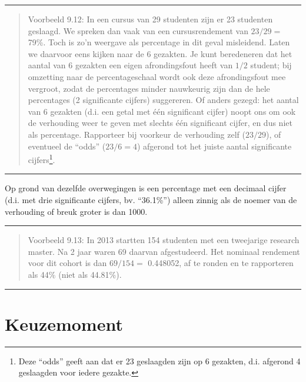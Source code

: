 \documentclass[
]{book}
\begin{document}
\begin{center}\rule{0.5\linewidth}{0.5pt}\end{center}

\begin{quote}
Voorbeeld 9.12:
In een cursus van 29 studenten zijn er 23 studenten geslaagd. We spreken
dan vaak van een cursusrendement van \(23/29=\) 79\%. Toch is zo'n weergave
als percentage in dit geval misleidend. Laten we daarvoor eens kijken
naar de 6 gezakten. Je kunt beredeneren dat het aantal van 6 gezakten
een eigen afrondingsfout heeft van \(1/2\) student; bij omzetting naar de
percentageschaal wordt ook deze afrondingsfout mee vergroot, zodat de
percentages minder nauwkeurig zijn dan de hele percentages (2
significante cijfers) suggereren. Of anders gezegd: het aantal van 6
gezakten (d.i. een getal met één significant cijfer) noopt ons om ook de
verhouding weer te geven met slechts één significant cijfer, en dus niet
als percentage. Rapporteer bij voorkeur de verhouding zelf (\(23/29\)), of
eventueel de ``odds'' (\(23/6=4\)) afgerond tot het juiste aantal
significante cijfers\footnote{Deze ``odds'' geeft aan dat er 23 geslaagden zijn op 6 gezakten, d.i. afgerond 4 geslaagden voor iedere gezakte.}.
\end{quote}

\begin{center}\rule{0.5\linewidth}{0.5pt}\end{center}

Op grond van dezelfde overwegingen is een percentage met een decimaal
cijfer (d.i. met drie significante cijfers, bv. ``36.1\%'') alleen zinnig
als de noemer van de verhouding of breuk groter is dan 1000.

\begin{center}\rule{0.5\linewidth}{0.5pt}\end{center}

\begin{quote}
Voorbeeld 9.13:
In 2013 startten 154 studenten met een tweejarige research master. Na 2
jaar waren 69 daarvan afgestudeerd. Het nominaal rendement voor dit
cohort is dan \(69/154=\) 0.448052, af te ronden en te rapporteren als 44\%
(niet als 44.81\%).
\end{quote}

\begin{center}\rule{0.5\linewidth}{0.5pt}\end{center}

\hypertarget{sec:robuustefficient}{%
\section{Keuzemoment}\label{sec:robuustefficient}}
\end{document}
